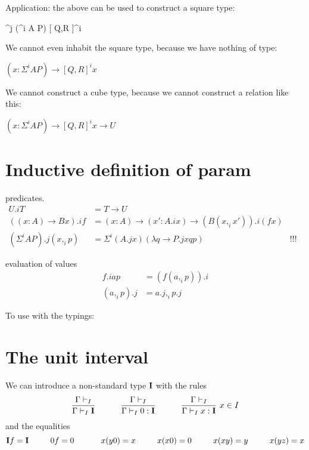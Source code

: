 \documentclass[10pt,a4paper]{article}
\newcommand\CSig[1]{\Sigma^{#1}}
\newcommand\linepred[3]{[ #2,#3 ]^{#1}}
\newcommand{\UI}{{\bf I}}
\begin{document}
Application: the above can be used to construct a square type:

          {\CSig j {(\CSig i A P)} \linepred i Q R}

We cannot even inhabit the square type, because we have nothing of type:

$(x : \CSig i A P) → \linepred i Q R x$

We cannot construct a cube type, because we cannot construct a relation like this:

$(x : \CSig i A P) → \linepred i Q R x → U$

\section{Inductive definition of param}

predicates. 
\begin{align*}
  U.i T &= T → U \\
  ((x:A) → B x).i f &= (x:A) → (x' : A.i x) → (B (x,_i x')).i (f x) \\
  (\CSig i A P).j (x,_i p) &= \CSig i (A.j x) (λq → P.j x q p) & \text{!!! swap}
\end{align*}

evaluation of values
\begin{align*}
  f.i a p &= (f (a,_i p)).i \\
  (a,_i p).j  &= a.j ,_i p.j 
\end{align*}

To use with the typings:
\begin{mathpar}

\end{mathpar}

\section{The unit interval}
 
 We can introduce a non-standard type $\UI$ with the rules
$$
\frac{\Gamma\vdash_I}{\Gamma\vdash_I \UI}~~~~~~~~~\frac{\Gamma\vdash_I}{\Gamma\vdash_I 0:\UI}~~~~~~~~~
\frac{\Gamma\vdash_I}{\Gamma\vdash_I x:\UI}~{x\in I}
$$
and the equalities
$$
\UI f = \UI~~~~~~~~0f = 0~~~~~~~~~~x(y0) = x~~~~~~~~x(x0) = 0~~~~~~~~x(xy) = y~~~~~~~~x(yz) = x
$$
\end{document}
